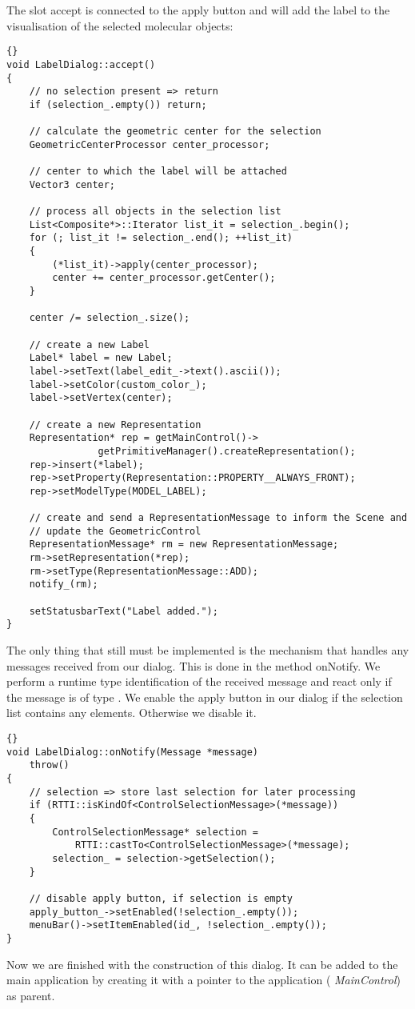 The slot accept is connected to the apply button and will add the label
to the visualisation of the selected molecular objects:
\begin{lstlisting}{}
void LabelDialog::accept()
{
	// no selection present => return
	if (selection_.empty()) return;

	// calculate the geometric center for the selection
	GeometricCenterProcessor center_processor;
	
	// center to which the label will be attached
	Vector3 center;

	// process all objects in the selection list
	List<Composite*>::Iterator list_it = selection_.begin();
	for (; list_it != selection_.end(); ++list_it)
	{
		(*list_it)->apply(center_processor);
		center += center_processor.getCenter();
	}

	center /= selection_.size();

	// create a new Label 
	Label* label = new Label;
	label->setText(label_edit_->text().ascii());
	label->setColor(custom_color_);
	label->setVertex(center);

	// create a new Representation
	Representation* rep = getMainControl()->
				getPrimitiveManager().createRepresentation();
	rep->insert(*label);
	rep->setProperty(Representation::PROPERTY__ALWAYS_FRONT);
	rep->setModelType(MODEL_LABEL);

	// create and send a RepresentationMessage to inform the Scene and
	// update the GeometricControl
	RepresentationMessage* rm = new RepresentationMessage;
	rm->setRepresentation(*rep);
	rm->setType(RepresentationMessage::ADD);
	notify_(rm);
	
	setStatusbarText("Label added.");
}
\end{lstlisting}

The only thing that still must be implemented is the mechanism that handles
any messages received from our dialog. This is done in the method
onNotify. 
We perform a runtime type identification of the received message and react only if the message is of
type .
We enable the apply button in our dialog if the selection list contains any
elements. Otherwise we disable it.

\begin{lstlisting}{}
void LabelDialog::onNotify(Message *message)
	throw()
{
	// selection => store last selection for later processing
	if (RTTI::isKindOf<ControlSelectionMessage>(*message))
	{
		ControlSelectionMessage* selection = 
			RTTI::castTo<ControlSelectionMessage>(*message);
		selection_ = selection->getSelection();
	}

	// disable apply button, if selection is empty
	apply_button_->setEnabled(!selection_.empty());
	menuBar()->setItemEnabled(id_, !selection_.empty());
}
\end{lstlisting}


Now we are finished with the construction of this dialog. It can be added to
the main application by creating it with a pointer to the application ({\em
MainControl}) as parent.

